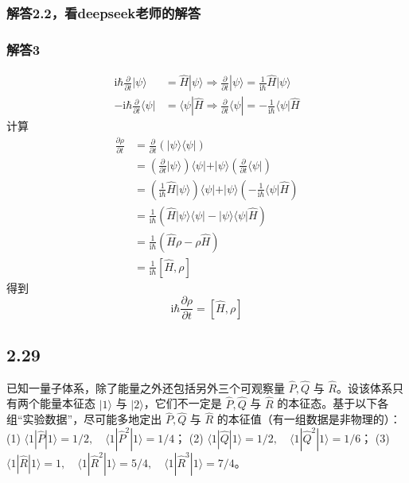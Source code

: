 \subsubsection{解答2.2，看deepseek老师的解答}




\subsubsection{解答3}

\begin{equation}
    \begin{aligned}
        \mathrm{i}\hbar \frac{\partial}{\partial t}|\psi \rangle &=\hat{H}|\psi \rangle \Rightarrow \frac{\partial}{\partial t}|\psi \rangle =\frac{1}{\mathrm{i}\hbar}\hat{H}|\psi \rangle 
\\
-\mathrm{i}\hbar \frac{\partial}{\partial t}\langle \psi |&=\langle \psi |\hat{H}\Rightarrow \frac{\partial}{\partial t}\langle \psi |=-\frac{1}{\mathrm{i}\hbar}\langle \psi |\hat{H}
    \end{aligned}
\end{equation}
计算
\begin{equation}
    \begin{aligned}
        \frac{\partial \rho}{\partial t}&=\frac{\partial}{\partial t}\left( |\psi \rangle \langle \psi | \right) 
\\
&=\left( \frac{\partial}{\partial t}|\psi \rangle \right) \langle \psi |+|\psi \rangle \left( \frac{\partial}{\partial t}\langle \psi | \right) 
\\
&=\left( \frac{1}{\mathrm{i}\hbar}\hat{H}|\psi \rangle \right) \langle \psi |+|\psi \rangle \left( -\frac{1}{\mathrm{i}\hbar}\langle \psi |\hat{H} \right) 
\\
&=\frac{1}{\mathrm{i}\hbar}\left( \hat{H}|\psi \rangle \langle \psi |-|\psi \rangle \langle \psi |\hat{H} \right) 
\\
&=\frac{1}{\mathrm{i}\hbar}\left( \hat{H}\rho -\rho \hat{H} \right) 
\\
&=\frac{1}{\mathrm{i}\hbar}\left[ \hat{H},\rho \right] 
    \end{aligned}
\end{equation}
得到
\begin{equation}
    \mathrm{i}\hbar \frac{\partial \rho}{\partial t}=\left[ \hat{H},\rho \right] 
\end{equation}



\subsection{2.29}
已知一量子体系，除了能量之外还包括另外三个可观察量 $\hat{P}, \hat{Q}$ 与 $\hat{R}$。设该体系只有两个能量本征态 $|1\rangle$ 与 $|2\rangle$，它们不一定是 $\hat{P}, \hat{Q}$ 与 $\hat{R}$ 的本征态。基于以下各组“实验数据”，尽可能多地定出 $\hat{P}, \hat{Q}$ 与 $\hat{R}$ 的本征值（有一组数据是非物理的）：
(1) $\langle 1|\hat{P}|1\rangle = 1/2, \quad \langle 1|\hat{P}^2|1\rangle = 1/4$；
(2) $\langle 1|\hat{Q}|1\rangle = 1/2, \quad \langle 1|\hat{Q}^2|1\rangle = 1/6$；
(3) $\langle 1|\hat{R}|1\rangle = 1, \quad \langle 1|\hat{R}^2|1\rangle = 5/4, \quad \langle 1|\hat{R}^3|1\rangle = 7/4$。


